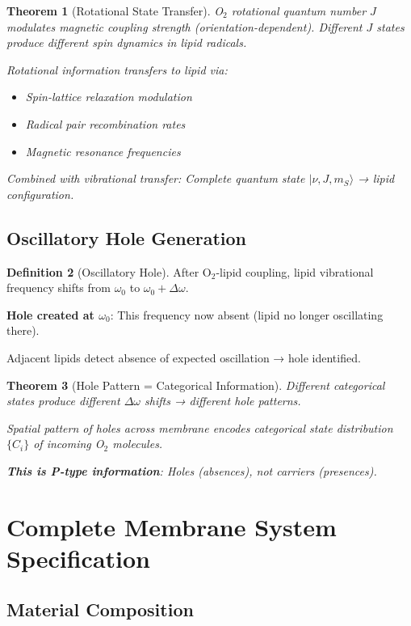 \documentclass[11pt,a4paper]{article}
\newtheorem{theorem}{Theorem}[section]
\theoremstyle{definition}
\newtheorem{definition}[theorem]{Definition}
\theoremstyle{remark}
\begin{document}
\begin{theorem}[Rotational State Transfer]
O$_2$ rotational quantum number $J$ modulates magnetic coupling strength (orientation-dependent). Different $J$ states produce different spin dynamics in lipid radicals.

Rotational information transfers to lipid via:
\begin{itemize}
\item Spin-lattice relaxation modulation
\item Radical pair recombination rates
\item Magnetic resonance frequencies
\end{itemize}

Combined with vibrational transfer: Complete quantum state $|\nu, J, m_S\rangle$ → lipid configuration.
\end{theorem}

\subsection{Oscillatory Hole Generation}

\begin{definition}[Oscillatory Hole]
After O$_2$-lipid coupling, lipid vibrational frequency shifts from $\omega_0$ to $\omega_0 + \Delta\omega$.

\textbf{Hole created at $\omega_0$}: This frequency now absent (lipid no longer oscillating there).

Adjacent lipids detect absence of expected oscillation → hole identified.
\end{definition}

\begin{theorem}[Hole Pattern = Categorical Information]
Different categorical states produce different $\Delta\omega$ shifts → different hole patterns.

Spatial pattern of holes across membrane encodes categorical state distribution $\{C_i\}$ of incoming O$_2$ molecules.

\textbf{This is P-type information}: Holes (absences), not carriers (presences).
\end{theorem}

\section{Complete Membrane System Specification}

\subsection{Material Composition}
\end{document}
